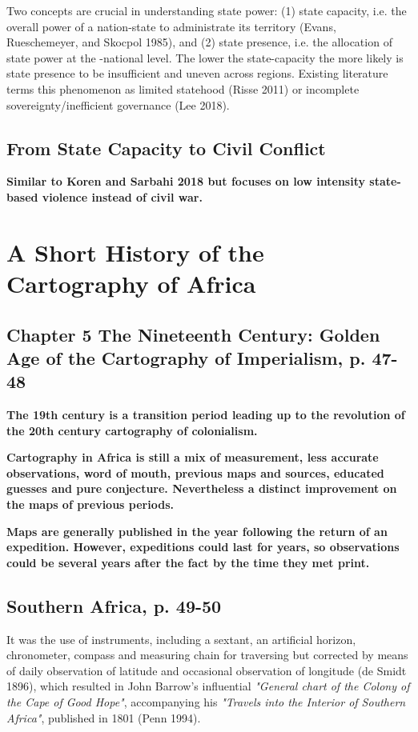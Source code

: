 \documentclass[12pt]{article}
\begin{document}
Two concepts are crucial in understanding state power: (1) state capacity, i.e.
the overall power of a nation-state to administrate its territory (Evans,
Rueschemeyer, and Skocpol 1985), and (2) state presence, i.e. the allocation of
state power at the -national level. The lower the state-capacity the more
likely is state presence to be insufficient and uneven across regions. Existing
literature terms this phenomenon as limited statehood (Risse 2011) or
incomplete sovereignty/inefficient governance (Lee 2018).

\subsection{From State Capacity to Civil Conflict}

\textbf{Similar to Koren and Sarbahi 2018 but focuses on low intensity state-based
violence instead of civil war.}

\section{A Short History of the Cartography of Africa \citep{Stone1995}}

\subsection{Chapter 5 The Nineteenth Century: Golden Age of the Cartography of
Imperialism, p. 47-48 }

\textbf{The 19th century is a transition period leading up to the revolution
of the 20th century cartography of colonialism.}

\textbf{Cartography in Africa is still a mix of measurement, less accurate
observations, word of mouth, previous maps and sources, educated guesses and
pure conjecture. Nevertheless a distinct improvement on the maps of previous
periods.}

\textbf{Maps are generally published in the year following the return of an
expedition. However, expeditions could last for years, so observations could be
several years after the fact by the time they met print.}

\subsection{Southern Africa, p. 49-50}

It was the use of instruments, including a sextant, an artificial horizon,
chronometer, compass and measuring chain for traversing but corrected by means
of daily observation of latitude and occasional observation of longitude (de
Smidt 1896), which resulted in John Barrow's influential 
\textit{"General chart of the Colony of the Cape of Good Hope"}, accompanying
his \textit{"Travels into the Interior of Southern Africa"}, published in 1801
(Penn 1994).
\end{document}
